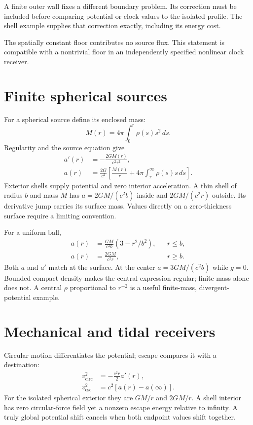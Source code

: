 \documentclass[10pt,twocolumn,letterpaper]{article}
\begin{document}
A finite outer wall fixes a different boundary problem. Its correction must be included before comparing potential or clock values to the isolated profile. The shell example supplies that correction exactly, including its energy cost.

The spatially constant floor contributes no source flux. This statement is compatible with a nontrivial floor in an independently specified nonlinear clock receiver.

\section{Finite spherical sources}
For a spherical source define its enclosed mass:
\[
M(r)=4\pi\int_0^r\rho(s)s^2\,ds.
\]
Regularity and the source equation give
\[
\begin{aligned}
a'(r)&=-\frac{2GM(r)}{c^2r^2},\\
a(r)&=\frac{2G}{c^2}\left[\frac{M(r)}{r}+4\pi\int_r^\infty\rho(s)s\,ds\right].
\end{aligned}
\]
Exterior shells supply potential and zero interior acceleration. A thin shell of radius $b$ and mass $M$ has $a=2GM/(c^2b)$ inside and $2GM/(c^2r)$ outside. Its derivative jump carries its surface mass. Values directly on a zero-thickness surface require a limiting convention.

For a uniform ball,
\[
\begin{aligned}
a(r)&=\frac{GM}{c^2b}(3-r^2/b^2),&&r\leq b,\\
a(r)&=\frac{2GM}{c^2r},&&r\geq b.
\end{aligned}
\]
Both $a$ and $a'$ match at the surface. At the center $a=3GM/(c^2b)$ while $g=0$. Bounded compact density makes the central expression regular; finite mass alone does not. A central $\rho$ proportional to $r^{-2}$ is a useful finite-mass, divergent-potential example.

\section{Mechanical and tidal receivers}
Circular motion differentiates the potential; escape compares it with a destination:
\[
\begin{aligned}
v_{\mathrm{circ}}^2&=-\frac{c^2r}{2}a'(r),\\
v_{\mathrm{esc}}^2&=c^2[a(r)-a(\infty)].
\end{aligned}
\]
For the isolated spherical exterior they are $GM/r$ and $2GM/r$. A shell interior has zero circular-force field yet a nonzero escape energy relative to infinity. A truly global potential shift cancels when both endpoint values shift together.
\end{document}
